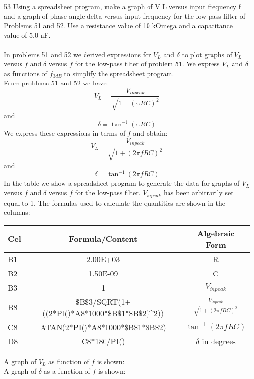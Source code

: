 \documentclass{report}
\begin{document}
\paragraph{}
53 Using a spreadsheet program, make a graph of V L versus input frequency f and a graph of phase angle delta versus input frequency for the low-pass filter of Problems 51 and 52. Use a resistance value of 10 kOmega and a capacitance value of 5.0 nF.\\
\\
In problems 51 and 52 we derived expressions for $V_L$ and $\delta$ to plot graphs of $V_L$ versus $f$ and $\delta$ versus $f$ for the low-pass filter of problem 51. We express $V_L$ and $\delta$ as functions of $f_{3dB}$ to simplify the spreadsheet program.\\
From problems 51 and 52 we have:
$$V_L = \frac{V_{in peak}}{\sqrt{1 + (\omega  RC)^2}}$$
and
$$\delta = \tan^{-1} (\omega RC)$$
We express these expressions in terms of $f$ and obtain:
$$V_L = \frac{V_{in peak}}{\sqrt{1 + (2\pi fRC)^2}}$$
and
$$\delta = \tan^{-1} (2\pi fRC)$$
In the table we show a spreadsheet program to generate the data for graphs of $V_L$ versus $f$ and $\delta$ versus $f$ for the low-pass filter. $V_{in peak}$ has been arbitrarily set equal to 1. The formulas used to calculate the quantities are shown in the columns:\\
\begin{tabular}{| l | c | c |}
  \hline
  Cel & Formula/Content & Algebraic Form \\
  \hline
  B1 & 2.00E+03 & R \\
  \hline
  B2 & 1.50E-09 & C \\
  \hline
  B3 & 1 & $V_{in peak}$\\
  \hline
  B8 & \$B\$3/SQRT(1+((2*PI()*A8*1000*\$B\$1*\$B\$2)\^{}2)) & $\frac{V_{in peak}}{\sqrt{1 + (2\pi fRC)^2}}$\\
  \hline
  C8 & ATAN(2*PI()*A8*1000*\$B\$1*\$B\$2) & $\tan^{-1} (2\pi fRC)$\\
  \hline
  D8 & C8*180/PI() & $\delta$ in degrees\\
  \hline
\end{tabular}
A graph of $V_L$ as function of $f$ is shown:\\
A graph of $\delta$ as a function of $f$ is shown:\\
\end{document}

